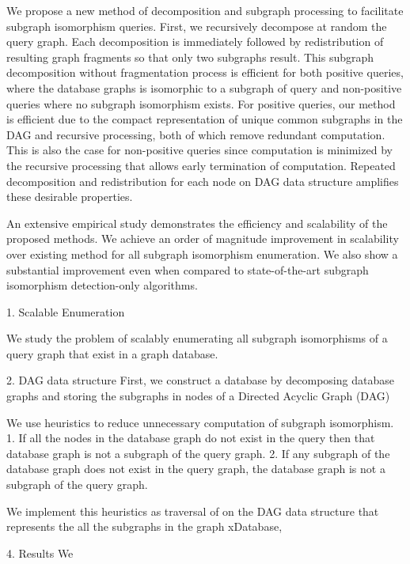 We propose a new method of decomposition and subgraph processing to facilitate subgraph isomorphism queries. First, we recursively decompose at random  the query graph. Each decomposition is immediately followed by redistribution of resulting graph fragments so that only two subgraphs result. This subgraph decomposition without fragmentation process is efficient for both positive queries, where the database graphs is isomorphic to a subgraph of query and non-positive queries where no subgraph isomorphism exists. For positive queries, our method is efficient due to the compact representation of unique common subgraphs in the DAG  and recursive processing, both of which remove redundant computation. This is also the case for non-positive queries since computation is minimized by the recursive processing that allows early termination of computation. Repeated decomposition and redistribution for each node on DAG data structure amplifies these desirable properties. 


An extensive empirical study demonstrates the efficiency and scalability of the proposed methods. We achieve  an order of magnitude improvement in scalability over existing method for all subgraph isomorphism enumeration.
We also show a substantial improvement even when compared to state-of-the-art subgraph isomorphism detection-only algorithms. 



1. Scalable Enumeration

We study the problem of scalably enumerating all subgraph isomorphisms of a query graph that exist in a graph database.

2. DAG data structure
First, we construct a database by decomposing database graphs and storing the subgraphs in nodes of a Directed Acyclic Graph (DAG)


We use heuristics to reduce unnecessary computation of subgraph isomorphism. 
1. If all the nodes in the database graph do not exist in the query then that database graph is not a subgraph of the query graph.
2. If any subgraph of the database graph does not exist in the query graph, the database graph is not a subgraph of the query graph.

We implement this heuristics as traversal of on the DAG data structure that represents the all the subgraphs in the graph xDatabase, 


4. Results
We 
